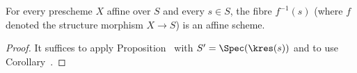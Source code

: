 \begin{cor}[1.5.4]
\label{2.1.5.4}
For every prescheme $X$ affine over $S$ and every $s\in S$, the fibre $f^{-1}(s)$ (where $f$ denoted the structure morphism $X\to S$) is an affine scheme.
\end{cor}

\begin{proof}
\label{proof-2.1.5.4}
It suffices to apply Proposition~ with $S'=\Spec(\kres(s))$ and to use Corollary~.
\end{proof}















